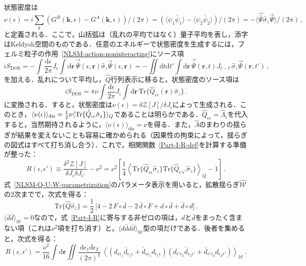 \documentclass[a4paper,11pt]{ltjsarticle}
\def\Tr{\mathrm{Tr}}
\def\d{\mathrm{d}}
\def\rt{(\mathbf{r},t)}
\begin{document}
状態密度は
$$\nu(\epsilon) =
i\sum_{k}(G^R(\mathbf{k},\epsilon)-
G^A(\mathbf{k},\epsilon))/(2\pi)=(\langle \psi_1\bar\psi_1\rangle
-\langle \psi_2\bar\psi_2\rangle)/(2\pi) =
-\big\langle\vec{\bar{\Psi}}\hat{\sigma}_z\vec{\Psi}\big\rangle/(2\pi)\,,$$
と定義される．ここで，山括弧は（乱れの平均ではなく）量子平均を表し，添字はKeldysh空間のものである．任意のエネルギーで状態密度を生成するには，フェルミ粒子の作用~\eqref{NLSM-action-noninteracting}にソース項
$$iS_{\mathrm{DOS}}=-\int\frac{\d\epsilon}{2\pi} J_\epsilon\int
\d\mathbf{r}\,\vec{\bar{\Psi}}(\epsilon,\mathbf{r})\hat{\sigma}_z
\vec{\Psi}(\epsilon,\mathbf{r})=-\iint\d t\d t'\int\d\mathbf{r}\,
\vec{\bar{\Psi}}\rt
J_{t-t'}\hat{\sigma}_z\vec{\Psi}(\mathbf{r},t')\,,$$
を加える．乱れについて平均し，$\hat Q$行列表示に移ると，状態密度のソース項は
$$iS_{\mathrm{DOS}}=\pi\nu\int\frac{\d\epsilon}{2\pi}
J_\epsilon\int\d\mathbf{r}\,\Tr\{\hat{Q}_{\epsilon\epsilon}(\mathbf{r})\hat
\sigma_z\}\,.$$
に変換される．すると，状態密度は$\nu(\epsilon)=\delta\mathcal{Z}[J]/\delta J_\epsilon$によって生成される．このとき，$\langle\nu(\epsilon)\rangle_{\mathrm{dis}}={1\over 2}\nu
\langle \Tr\{\hat{Q}_{\epsilon\epsilon}\hat{\sigma}_z\}\rangle_Q$であることは明らかである．$\hat{Q}_{\epsilon\epsilon}=\hat{\Lambda}_\epsilon$を代入すると，当然期待されるように，$\langle\nu(\epsilon)\rangle_{\mathrm{dis}}=\nu$を得る．また，$\hat{\Lambda}$のまわりの揺らぎが結果を変えないことも容易に確かめられる（因果性の拘束によって，揺らぎの図式はすべて打ち消し合う）．これで，相関関数~\eqref{Part-I-R-def}を計算する準備が整った：
\begin{equation}\label{Part-I-R}
R(\epsilon,\epsilon')\equiv\frac{\delta^{2}\mathcal{Z}[J]}{\delta
J_\epsilon \delta J_{\epsilon'}} -\nu^2=\nu^{2}\left[\frac{1}{4}
\left\langle \Tr\{\hat{Q}_{\epsilon\epsilon}\hat{\sigma}_{z}\}\Tr\{
\hat{Q}_{\epsilon'\epsilon'}\hat{\sigma}_{z}\}\right\rangle_{Q}-1\right]\,.
\end{equation}
式~\eqref{NLSM-Q-U-W-parametrization}のパラメータ表示を用いると，拡散揺らぎ$\hat{\mathcal{W}}$の2次までで，次式を得る：
\begin{equation}
\Tr\big\{\hat{Q}\hat{\sigma}_{z}\big\}=\frac{1}{2}\,\big[4-2\,F\circ\bar{d}-2\,\bar{d}\circ
F+d\circ\bar{d}+\bar{d}\circ d\big]\,.
\end{equation}
$\langle\bar{d}\bar{d}\rangle_{\mathcal{W}}=0$なので，式~\eqref{Part-I-R}に寄与する非ゼロの項は，$d$と$\bar{d}$をまったく含まない項（これは$\nu^{2}$項を打ち消す）と，$\langle d\bar{d}d\bar{d}\rangle_{\mathcal{W}}$型の項だけである．後者を集めると，次式を得る：
\begin{equation}\label{Part-I-R-dd}
R(\epsilon,\epsilon')=\frac{\nu^{2}}{16}\int\d\mathbf{r}
\iint\frac{\d\epsilon_{1}\d\epsilon_{2}}{(2\pi)^{2}}
\,\left\langle\left(d_{\epsilon\epsilon_{1}}\bar{d}_{\epsilon_{1}\epsilon}+
\bar{d}_{\epsilon\epsilon_{1}}d_{\epsilon_{1}\epsilon}\right)
\left(d_{\epsilon'\epsilon_{2}}\bar{d}_{\epsilon_{2}\epsilon'}+
\bar{d}_{\epsilon'\epsilon_{2}}d_{\epsilon_{2}\epsilon'}\right)\right\rangle_{\mathcal{W}}\,.
\end{equation}
\end{document}
